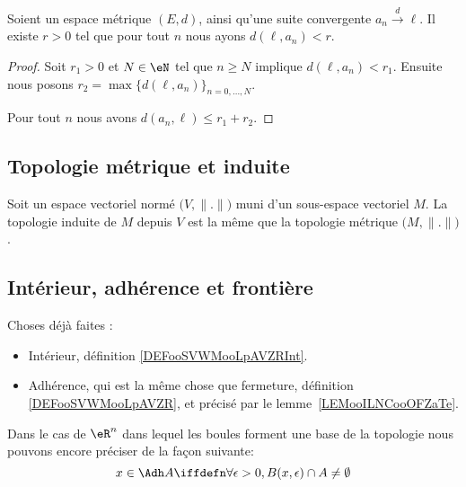 \begin{proposition}      \label{PROPooUXDJooCrWBbd}
	Soient un espace métrique \( (E,d)\), ainsi qu'une suite convergente \( a_n\stackrel{d}{\longrightarrow}\ell\). Il existe \( r>0\) tel que pour tout \( n\) nous ayons \( d(\ell, a_n)<r\).
\end{proposition}

\begin{proof}
	Soit \( r_1>0\) et \( N\in \eN\) tel que \( n\geq N\) implique \( d(\ell,a_n)<r_1\). Ensuite nous posons \( r_2=\max\{ d(\ell,a_n) \}_{n=0,\ldots, N}\).

	Pour tout \( n\) nous avons \( d(a_n,\ell)\leq r_1+r_2\).
\end{proof}

\subsection{Topologie métrique et induite}

\begin{lemma}       \label{LEMooKDMYooMIcFRI}
    Soit un espace vectoriel normé \( \big( V,\| . \| \big)   \) muni d'un sous-espace vectoriel \( M\). La topologie induite de \( M\) depuis \( V\) est la même que la topologie métrique \( \big( M,\| . \| \big)\).
\end{lemma}

\subsection{Intérieur, adhérence et frontière}

\begin{normaltext}
	Choses déjà faites :
	\begin{itemize}
		\item
		      Intérieur, définition \ref{DEFooSVWMooLpAVZRInt}.
		\item
		      Adhérence, qui est la même chose que fermeture, définition \ref{DEFooSVWMooLpAVZR}, et précisé par le lemme~\ref{LEMooILNCooOFZaTe}.
	\end{itemize}

	Dans le cas de \( \eR^n\) dans lequel les boules forment une base de la topologie nous pouvons encore préciser de la façon suivante:
	\begin{equation}
		x \in \Adh A \iffdefn \forall \epsilon > 0, B(x,\epsilon) \cap A \neq \emptyset
	\end{equation}
\end{normaltext}

